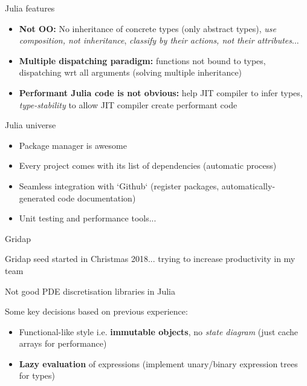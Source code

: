\begin{frame}{Julia features}

\begin{itemize}

  \item \textbf{Not OO:} No inheritance of concrete types (only abstract types), \emph{use composition, not inheritance}, \emph{classify by their actions, not their attributes}...

  \item \textbf{Multiple dispatching paradigm:} functions not bound to types, dispatching wrt all arguments (solving multiple inheritance)

  \item \textbf{Performant Julia code is not obvious:} help JIT compiler to infer types, \emph{type-stability} to allow JIT compiler create performant code

\end{itemize}

\end{frame}

\begin{frame}{Julia universe}

\begin{itemize}

  \item Package manager is awesome

  \item Every project comes with its list of dependencies (automatic process)

  \item Seamless integration with `Github` (register packages, automatically-generated code documentation)

  \item Unit testing and performance tools...

\end{itemize}

\end{frame}

\begin{frame}{Gridap}

Gridap seed started in Christmas 2018... trying to increase productivity in my team

Not good PDE discretisation libraries in Julia

Some key decisions based on previous experience:

\begin{itemize}

  \item Functional-like style i.e. \textbf{immutable objects}, no \emph{state diagram} (just cache arrays for performance)

  \item \textbf{Lazy evaluation} of expressions (implement unary/binary expression trees for types)

\end{itemize}

\end{frame}


